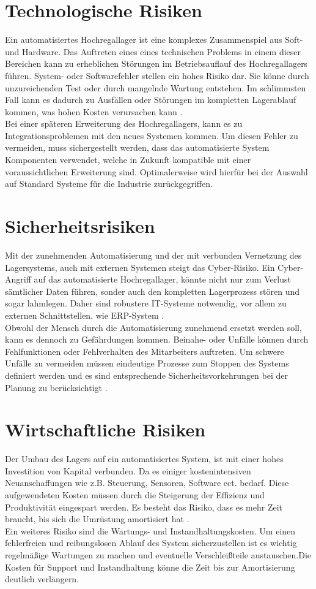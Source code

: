 \section{Technologische Risiken}
Ein automatisiertes Hochregallager ist eine komplexes Zusammenspiel aus Soft- und Hardware. Das Auftreten eines eines technischen Problems in einem dieser Bereichen kann zu erheblichen Störungen im Betriebsauflauf des Hochregallagers führen.
%
System- oder Softwarefehler stellen ein hohes Risiko dar. Sie könne durch unzureichenden Test oder durch mangelnde Wartung entstehen. Im schlimmsten Fall kann es dadurch zu Ausfällen oder Störungen im kompletten Lagerablauf kommen, was hohen Kosten verursachen kann \autocite{hartel_projektmanagement_2019}.\\
Bei einer späteren Erweiterung des Hochregallagers, kann es zu Integrationsproblemen mit den neues Systemen kommen. Um diesen Fehler zu vermeiden, muss sichergestellt werden, dass das automatisierte System Komponenten verwendet, welche in Zukunft kompatible mit einer voraussichtlichen Erweiterung sind. Optimalerweise wird hierfür bei der Auswahl auf Standard Systeme für die Industrie zurückgegriffen.
\section{Sicherheitsrisiken}
Mit der zunehmenden Automatisierung und der mit verbunden Vernetzung des Lagersystems, auch mit externen Systemen steigt das Cyber-Risiko. Ein Cyber-Angriff auf das automatisierte Hochregallager, könnte nicht nur zum Verlust sämtlicher Daten führen, sonder auch den kompletten Lagerprozess stören und sogar lahmlegen. Daher sind robustere IT-Systeme notwendig, vor allem zu externen Schnittstellen, wie ERP-System \autocite{haumer_it-sicherheit_2015}.\\
%
Obwohl der Mensch durch die Automatisierung zunehmend ersetzt werden soll, kann es dennoch zu Gefährdungen kommen. Beinahe- oder Unfälle können durch Fehlfunktionen oder Fehlverhalten des Mitarbeiters auftreten. Um schwere Unfälle zu vermeiden müssen eindeutige Prozesse zum Stoppen des Systems definiert werden und es sind entsprechende Sicherheitsvorkehrungen bei der Planung zu berücksichtigt \autocite{fahl2016}.
\section{Wirtschaftliche Risiken}
Der Umbau des Lagers auf ein automatisiertes System, ist mit einer hohes Investition von Kapital verbunden. Da es einiger kostenintensiven Neuanschaffungen wie z.B. Steuerung, Sensoren, Software ect. bedarf. Diese aufgewendeten Kosten müssen durch die Steigerung der Effizienz und Produktivität eingespart werden. Es besteht das Risiko, dass es mehr Zeit braucht, bis sich die Umrüstung amortisiert hat \autocite{schmitz1994}.\\
%
Ein weiteres Risiko sind die Wartungs- und Instandhaltungskosten. Um einen fehlerfreien und reibungslosen Ablauf des System sicherzustellen ist es wichtig regelmäßige Wartungen zu machen und eventuelle Verschleißteile austauschen.Die Kosten für Support und Instandhaltung könne die Zeit bis zur Amortisierung deutlich verlängern. 